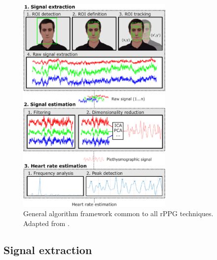 \begin{figure}
\centering
\includegraphics[width=3.0in]{figures/general-rppg}
\caption{General algorithm framework common to all rPPG techniques. Adapted from \parencite{rouast2016remote}.}
\label{fig:rppg}
\end{figure}

\subsection{Signal extraction}

